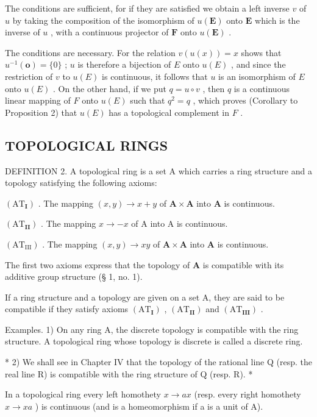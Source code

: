 The conditions are sufficient, for if they are satisfied we obtain a left inverse \(v\) of \(u\) by taking the composition of the isomorphism of \(u(\mathbf{E})\) onto \(\mathbf{E}\) which is the inverse of \(u\) , with a continuous projector of \(\mathbf{F}\) onto \(u(\mathbf{E})\) .

The conditions are necessary. For the relation \(v(u(x)) = x\) shows that \(u^{-1}(\mathbf{o}) = \{0\}\) ; \(u\) is therefore a bijection of \(E\) onto \(u(E)\) , and since the restriction of \(v\) to \(u(E)\) is continuous, it follows that \(u\) is an isomorphism of \(E\) onto \(u(E)\) . On the other hand, if we put \(q = u \circ v\) , then \(q\) is a continuous linear mapping of \(F\) onto \(u(E)\) such that \(q^2 = q\) , which proves (Corollary to Proposition 2) that \(u(E)\) has a topological complement in \(F\) .

\subsection{TOPOLOGICAL RINGS}

DEFINITION 2. A topological ring is a set A which carries a ring structure and a topology satisfying the following axioms:

\((\mathrm{AT}_{\mathbf{I}})\) . The mapping \((x,y) \to x + y\) of \(\mathbf{A} \times \mathbf{A}\) into \(\mathbf{A}\) is continuous.

\((\mathrm{AT}_{\mathbf{II}})\) . The mapping \(x \to -x\) of A into A is continuous.

\((\mathrm{AT}_{\mathrm{III}})\) . The mapping \((x,y)\to xy\) of \(\mathbf{A}\times \mathbf{A}\) into \(\mathbf{A}\) is continuous.

The first two axioms express that the topology of \(\mathbf{A}\) is compatible with its additive group structure (§ 1, no. 1).

If a ring structure and a topology are given on a set A, they are said to be compatible if they satisfy axioms \((\mathrm{AT}_{\mathbf{I}})\) , \((\mathrm{AT}_{\mathbf{II}})\) and \((\mathrm{AT}_{\mathbf{III}})\) .

Examples. 1) On any ring A, the discrete topology is compatible with the ring structure. A topological ring whose topology is discrete is called a discrete ring.

* 2) We shall see in Chapter IV that the topology of the rational line Q (resp. the real line R) is compatible with the ring structure of Q (resp. R). *

In a topological ring every left homothety \(x \rightarrow ax\) (resp. every right homothety \(x \rightarrow xa\) ) is continuous (and is a homeomorphism if a is a unit of A).

